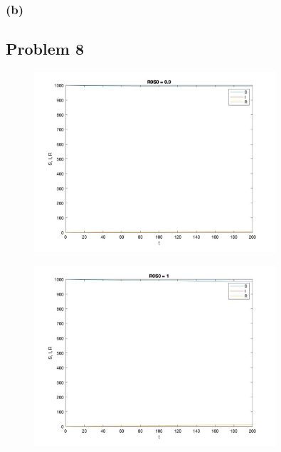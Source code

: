 \documentclass[11pt,fleqn]{exam}
\begin{document}


\subsubsection*{(b)}



\subsection*{Problem 8}
\begin{figure}[H]
  	\centering
  	\includegraphics[width=0.8\textwidth]{q81.jpg}
\end{figure}	

\begin{figure}[H]
  	\centering
  	\includegraphics[width=0.8\textwidth]{q82.jpg}
\end{figure}	
\end{document}
